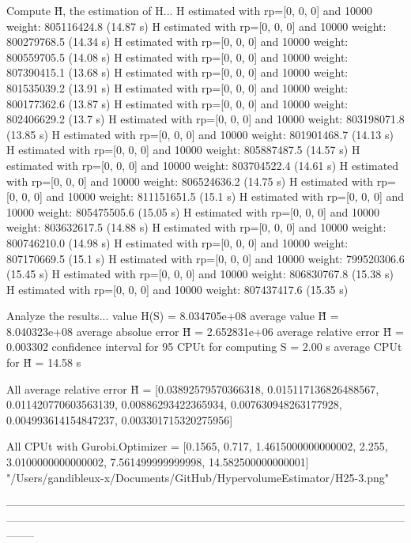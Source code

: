 Compute H̃, the estimation of H...
  H estimated with rp=[0, 0, 0] and 10000 weight:  805116424.8  (14.87 s)
  H estimated with rp=[0, 0, 0] and 10000 weight:  800279768.5  (14.34 s)
  H estimated with rp=[0, 0, 0] and 10000 weight:  800559705.5  (14.08 s)
  H estimated with rp=[0, 0, 0] and 10000 weight:  807390415.1  (13.68 s)
  H estimated with rp=[0, 0, 0] and 10000 weight:  801535039.2  (13.91 s)
  H estimated with rp=[0, 0, 0] and 10000 weight:  800177362.6  (13.87 s)
  H estimated with rp=[0, 0, 0] and 10000 weight:  802406629.2  (13.7 s)
  H estimated with rp=[0, 0, 0] and 10000 weight:  803198071.8  (13.85 s)
  H estimated with rp=[0, 0, 0] and 10000 weight:  801901468.7  (14.13 s)
  H estimated with rp=[0, 0, 0] and 10000 weight:  805887487.5  (14.57 s)
  H estimated with rp=[0, 0, 0] and 10000 weight:  803704522.4  (14.61 s)
  H estimated with rp=[0, 0, 0] and 10000 weight:  806524636.2  (14.75 s)
  H estimated with rp=[0, 0, 0] and 10000 weight:  811151651.5  (15.1 s)
  H estimated with rp=[0, 0, 0] and 10000 weight:  805475505.6  (15.05 s)
  H estimated with rp=[0, 0, 0] and 10000 weight:  803632617.5  (14.88 s)
  H estimated with rp=[0, 0, 0] and 10000 weight:  800746210.0  (14.98 s)
  H estimated with rp=[0, 0, 0] and 10000 weight:  807170669.5  (15.1 s)
  H estimated with rp=[0, 0, 0] and 10000 weight:  799520306.6  (15.45 s)
  H estimated with rp=[0, 0, 0] and 10000 weight:  806830767.8  (15.38 s)
  H estimated with rp=[0, 0, 0] and 10000 weight:  807437417.6  (15.35 s)

Analyze the results...
  value H(S)                  = 8.034705e+08 
  average value H̃             = 8.040323e+08 
  average absolue error H̃     = 2.652831e+06 
  average relative error H̃    = 0.003302 
  confidence interval for 95%
  CPUt for computing S         = 2.00 s
  average CPUt for H̃           = 14.58 s

All average relative error H̃ = [0.03892579570366318, 0.015117136826488567, 0.011420770603563139, 0.00886293422365934, 0.007630948263177928, 0.004993614154847237, 0.003301715320275956]

All CPUt with Gurobi.Optimizer = [0.1565, 0.717, 1.4615000000000002, 2.255, 3.0100000000000002, 7.561499999999998, 14.582500000000001]
"/Users/gandibleux-x/Documents/GitHub/HypervolumeEstimator/H25-3.png"

--------------------------------------------------------------------------------------------------------------------------------------------------------------------------------------------------------------------------------

